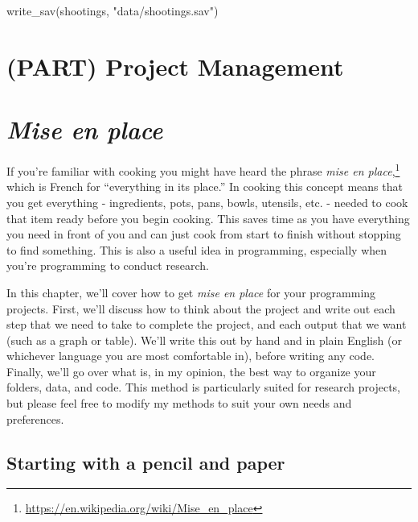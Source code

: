 \documentclass[
  a4paper,
]{krantz}
\makeatletter
\newenvironment{Shaded}{\begin{snugshade}}{\end{snugshade}}
\newcommand{\FunctionTok}[1]{\textcolor[rgb]{0.00,0.00,0.00}{#1}}
\newcommand{\NormalTok}[1]{#1}
\newcommand{\StringTok}[1]{\textcolor[rgb]{0.31,0.60,0.02}{#1}}
\renewcommand{\href}[2]{#2\footnote{\url{#1}}}
\newenvironment{kframe}{%
\medskip{}
\setlength{\fboxsep}{.8em}
 \def\at@end@of@kframe{}%
 \ifinner\ifhmode%
  \def\at@end@of@kframe{\end{minipage}}%
  \begin{minipage}{\columnwidth}%
 \fi\fi%
 \def\FrameCommand##1{\hskip\@totalleftmargin \hskip-\fboxsep
 \colorbox{shadecolor}{##1}\hskip-\fboxsep
     \hskip-\linewidth \hskip-\@totalleftmargin \hskip\columnwidth}%
 \MakeFramed {\advance\hsize-\width
   \@totalleftmargin\z@ \linewidth\hsize
   \@setminipage}}%
 {\par\unskip\endMakeFramed%
 \at@end@of@kframe}
\renewenvironment{Shaded}{\begin{kframe}}{\end{kframe}}
\makeatother
\begin{document}
\begin{Shaded}
\begin{Highlighting}[]
\FunctionTok{write\_sav}\NormalTok{(shootings, }\StringTok{"data/shootings.sav"}\NormalTok{)}
\end{Highlighting}
\end{Shaded}

\hypertarget{part-project-management}{%
\chapter*{(PART) Project
Management}\label{part-project-management}}

\hypertarget{mise-en-place}{%
\chapter{\texorpdfstring{\emph{Mise en
place}}{Mise en place}}\label{mise-en-place}}

If you're familiar with cooking you might have heard the
phrase
\href{https://en.wikipedia.org/wiki/Mise_en_place}{\emph{mise
en place},} which is French for ``everything in its place.''
In cooking this concept means that you get everything -
ingredients, pots, pans, bowls, utensils, etc. - needed to
cook that item ready before you begin cooking. This saves
time as you have everything you need in front of you and can
just cook from start to finish without stopping to find
something. This is also a useful idea in programming,
especially when you're programming to conduct research.

In this chapter, we'll cover how to get \emph{mise en place}
for your programming projects. First, we'll discuss how to
think about the project and write out each step that we need
to take to complete the project, and each output that we
want (such as a graph or table). We'll write this out by
hand and in plain English (or whichever language you are
most comfortable in), before writing any code. Finally,
we'll go over what is, in my opinion, the best way to
organize your folders, data, and code. This method is
particularly suited for research projects, but please feel
free to modify my methods to suit your own needs and
preferences.

\hypertarget{starting-with-a-pencil-and-paper}{%
\section{Starting with a pencil and
paper}\label{starting-with-a-pencil-and-paper}}
\end{document}
